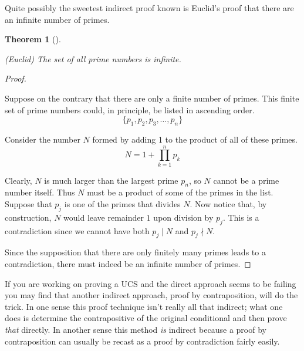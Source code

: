 \documentclass[10pt,]{book}
\theoremstyle{plain}
\newtheorem{theorem}{Theorem}[section]
\theoremstyle{definition}
\theoremstyle{definition}
\numberwithin{equation}{section}
\newcommand{\divides}{\!\mid\!}
\begin{document}
    Quite possibly the sweetest indirect proof known is Euclid's proof that there
    are an infinite number of primes.
\begin{theorem}[{}]\label{theorem-7}

        (Euclid) The set of all prime numbers is infinite.
\end{theorem}
\begin{proof}\hypertarget{proof-11}{}

      Suppose on the contrary that there are only a finite number
      of primes. This finite set of prime numbers could, in principle, be listed
      in ascending order.
      \begin{equation*}
        \{ p_1, p_2, p_3, \ldots , p_n \}
      \end{equation*}
\par

      Consider the number \(N\) formed by adding 1 to the product of all of these
      primes.
      \begin{equation*}
        N = 1 + \prod_{k=1}^n p_k
      \end{equation*}
\par

      Clearly, \(N\) is much larger than the largest prime \(p_n\), so \(N\) cannot
      be a prime number itself. Thus \(N\) must be a product of some of the
      primes in the list. Suppose that \(p_j\) is one of the primes that
      divides \(N\). Now notice that, by construction, \(N\) would leave remainder
      \(1\) upon division by \(p_j\). This is a contradiction since we cannot have
      both \(p_j \divides N\) and \(p_j \nmid N\).
\par

      Since the supposition that there are only finitely many primes leads to
      a contradiction, there must indeed be an infinite number of primes.
\end{proof}
\par

    If you are working on proving a UCS and the direct approach seems to be
    failing you may find that another indirect approach,
    proof by contraposition,
    will do the trick. In one sense this proof technique isn't really all that
    indirect; what one does is determine the contrapositive of the original
    conditional and then prove \emph{that} directly. In another sense this
    method \emph{is} indirect because a proof by contraposition can usually
    be recast as a proof by contradiction fairly easily.
\par
\end{document}
